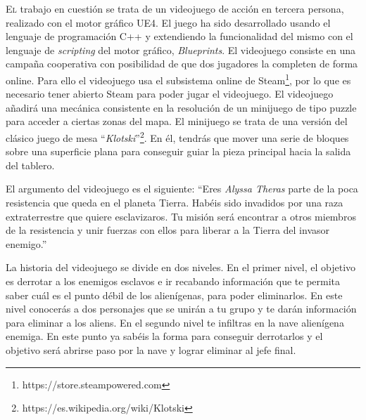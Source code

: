 \lettrine[lines=2,findent=2pt,nindent=3pt,loversize=0.1]{\textcolor[gray]{0.4}{E}}{l} trabajo en cuestión se trata de un videojuego de acción en tercera persona, realizado con el motor gráfico \ac{UE4}. El juego ha sido desarrollado usando el lenguaje de programación C++ y extendiendo la funcionalidad del mismo con el lenguaje de \textit{scripting} del motor gráfico, \textit{Blueprints}. El videojuego consiste en una campaña cooperativa con posibilidad de que dos jugadores la completen de forma online. Para ello el videojuego usa el subsistema online de Steam\footnote{https://store.steampowered.com}, por lo que es necesario tener abierto Steam para poder jugar el videojuego. El videojuego añadirá una mecánica consistente en la resolución de un minijuego de tipo puzzle para acceder a ciertas zonas del mapa. El minijuego se trata de una versión del clásico juego de mesa ``\textit{Klotski}''\footnote{https://es.wikipedia.org/wiki/Klotski}. En él, tendrás que mover una serie de bloques sobre una superficie plana para conseguir guiar la pieza principal hacia la salida del tablero.

El argumento del videojuego es el siguiente: ``Eres \textit{Alyssa Theras} parte de la poca resistencia que queda en el planeta Tierra. Habéis sido invadidos por una raza extraterrestre que quiere esclavizaros. Tu misión será encontrar a otros miembros de la resistencia y unir fuerzas con ellos para liberar a la Tierra del invasor enemigo.''

La historia del videojuego se divide en dos niveles. En el primer nivel, el objetivo es derrotar a los enemigos esclavos e ir recabando información que te permita saber cuál es el punto débil de los alienígenas, para poder eliminarlos. En este nivel conocerás a dos personajes que se unirán a tu grupo y te darán información para eliminar a los aliens. En el segundo nivel te infiltras en la nave alienígena enemiga. En este punto ya sabéis la forma para conseguir derrotarlos y el objetivo será abrirse paso por la nave y lograr eliminar al jefe final.